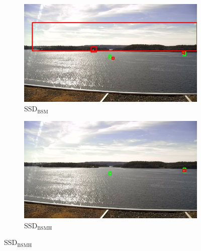\begin{figure}
\begin{subfigure}{.5\textwidth}
  \centering
  \includegraphics[width=0.9\linewidth]{results/case_buildings/bigbox_bcbf/SSD2/selected_08_07_frame1916.jpg}
  \caption{SSD$_{\text{BSM}}$}
  \label{fig:sfig1}
\end{subfigure}%
\begin{subfigure}{.5\textwidth}
  \centering
  \includegraphics[width=.9\linewidth]{results/case_buildings/bigbox_bcbf/SSD3/selected_08_07_frame1916.jpg}
  \caption{SSD$_{\text{BSMH}}$}
  \label{fig:sfig2}
\end{subfigure}


\end{figure}
